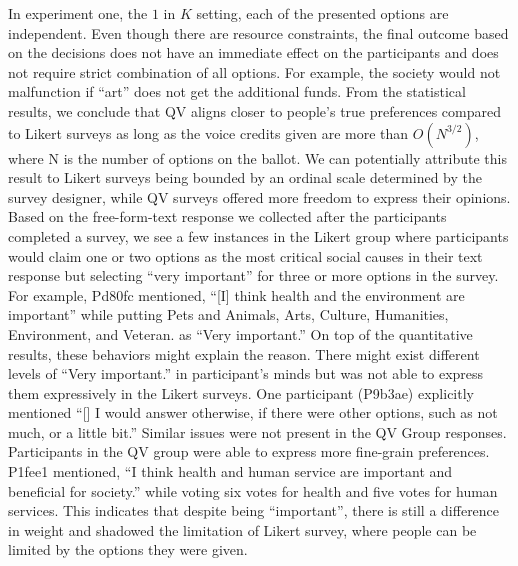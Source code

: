 In experiment one,
the $1$ in $K$ setting,
each of the presented options
are independent.
Even though there are resource constraints,
the final outcome based on the decisions
does not have an immediate effect on the participants and does not require
strict combination of all options.
For example,
the society would not malfunction if ``art''
does not get the additional funds.
From the statistical results, we conclude that QV aligns closer to people's true preferences
compared to Likert surveys
as long as the voice credits given
are more than $O(N^{3/2})$, where N is the number of options on the ballot.
We can potentially attribute this result 
to Likert surveys being bounded by an ordinal scale determined by the survey designer, while QV surveys offered more freedom to express their opinions. 
Based on the free-form-text response we collected after the participants completed a survey,
we see a few instances in the Likert group 
where participants would claim one or two options 
as the most critical social causes in their text response 
but selecting ``very important'' for 
three or more options in the survey.
For example, Pd80fc mentioned, ``[I] think health and the environment are important'' while putting Pets and Animals, Arts, Culture, Humanities, Environment, and Veteran. as ``Very important.''
On top of the quantitative results,
these behaviors might explain the reason.
There might exist different levels of ``Very important.'' 
in participant's minds but was not able to express them expressively in the Likert surveys.
One participant (P9b3ae) explicitly mentioned ``[\textellipsis] I would answer otherwise, if there were other options, such as not much, or a little bit.''
Similar issues were not present in the QV Group responses.
Participants in the QV group were able to express more fine-grain preferences.
P1fee1 mentioned, ``I think health and human service are important and beneficial for society.'' while voting six votes for health and five votes for human services. This indicates that despite being ``important'', there is still a difference in weight and shadowed the limitation of Likert survey, where people can be limited by the options they were given.\par

